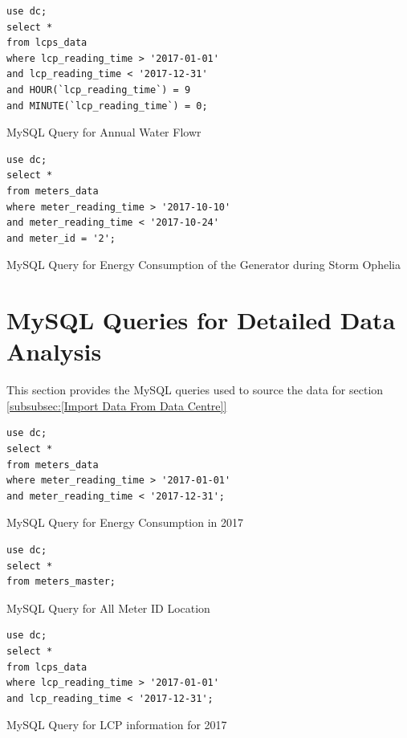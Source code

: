 \documentclass[12pt]{scrartcl}
\begin{document}
\begin{listing}[H]
\begin{verbatim}
use dc; 
select * 
from lcps_data
where lcp_reading_time > '2017-01-01'
and lcp_reading_time < '2017-12-31' 
and HOUR(`lcp_reading_time`) = 9
and MINUTE(`lcp_reading_time`) = 0;
\end{verbatim}
\caption{MySQL Query for Annual Water Flowr}
\label{list:[MySQL Query for Annual Water Flow]}
\end{listing}

\begin{listing}[H]
\begin{verbatim}
use dc; 
select * 
from meters_data
where meter_reading_time > '2017-10-10'
and meter_reading_time < '2017-10-24'
and meter_id = '2';
\end{verbatim}
\caption{MySQL Query for Energy Consumption of the Generator during Storm Ophelia}
\label{list:[MySQL Query for Energy Consumption of the Generator during Storm Ophelia]}
\end{listing}

\section{MySQL Queries for Detailed Data Analysis}
\label{sec:[Detailed MySQL Queries]}
This section provides the MySQL queries used to source the data for section \ref{subsubsec:[Import Data From Data Centre]}

\begin{listing}[H]
\begin{verbatim}
use dc; 
select * 
from meters_data
where meter_reading_time > '2017-01-01'
and meter_reading_time < '2017-12-31';
\end{verbatim}
\caption{MySQL Query for Energy Consumption in 2017}
\label{list:[MySQL Query for Energy Consumption in 2017]}
\end{listing}

\begin{listing}[H]
\begin{verbatim}
use dc; 
select * 
from meters_master;
\end{verbatim}
\caption{MySQL Query for All Meter ID Location}
\label{list:[MySQL Query for All Meter ID Location]}
\end{listing}

\begin{listing}[H]
\begin{verbatim}
use dc; 
select * 
from lcps_data
where lcp_reading_time > '2017-01-01'
and lcp_reading_time < '2017-12-31';
\end{verbatim}
\caption{MySQL Query for LCP information for 2017}
\label{list:[MySQL Query for LCP information for 2017]}
\end{listing}
\end{document}
